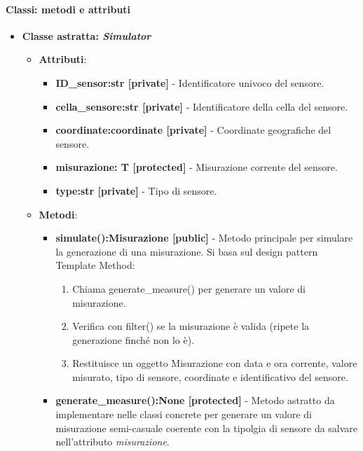 \paragraph{Classi: metodi e attributi}
\begin{itemize}
    \item {\textbf{Classe astratta: \textit{Simulator}}}
        \begin{itemize}
            \item \textbf{Attributi}: 
            \begin{itemize}
                \item \textbf{ID\_sensor:str [private]} - Identificatore univoco del sensore.
                \item \textbf{cella\_sensore:str [private]} - Identificatore della cella del sensore.
                \item \textbf{coordinate:coordinate [private]} - Coordinate geografiche del sensore.
                \item \textbf{misurazione: T [protected]} - Misurazione corrente del sensore.
                \item \textbf{type:str [private]} - Tipo di sensore.
            \end{itemize}
            \item \textbf{Metodi}:
            \begin{itemize}
                \item \textbf{simulate():Misurazione [public]} - Metodo principale per simulare la generazione di una misurazione.
                Si basa sul design pattern Template Method:
                \begin{enumerate}
                    \item     Chiama generate\_measure() per generare un valore di misurazione.
                    \item     Verifica con filter() se la misurazione è valida (ripete la generazione finché non lo è).
                    \item     Restituisce un oggetto Misurazione con data e ora corrente, valore misurato, tipo di sensore, coordinate e identificativo del sensore.
                \end{enumerate}
                \item \textbf{generate\_measure():None [protected]} - Metodo astratto da implementare nelle classi concrete per generare un valore di misurazione semi-casuale coerente con la tipolgia di sensore da salvare nell'attributo \textit{misurazione}.

\end{itemize}
\end{itemize}
\end{itemize}
